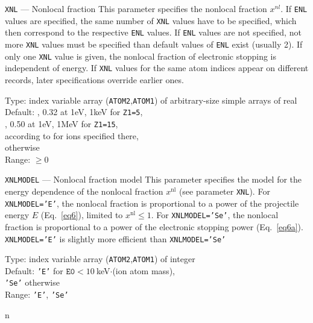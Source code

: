 \begin{keydescription}{\texttt{XNL} --- Nonlocal fraction}
%
  This parameter specifies the nonlocal fraction $x^{nl}$. If \texttt{ENL}
  values are specified, the same number of \texttt{XNL} values have to be 
  specified, which then correspond to the respective \texttt{ENL} values. 
  If \texttt{ENL} values are not specified, not more \texttt{XNL}
  values must be specified than default values of \texttt{ENL} exist (usually
  2). If only one \texttt{XNL} value is given, the nonlocal fraction of
  electronic stopping is independent of energy. If \texttt{XNL} values for
  the same atom indices appear on different records, later specifications
  override earlier ones.
  \begin{keytab}
    Type:    \> index variable array (\texttt{ATOM2},\texttt{ATOM1}) 
                of arbitrary-size simple arrays of real \\
    Default: , 0.32 at 1eV, 1keV for \texttt{Z1=5}, \\
             , 0.50 at 1eV, 1MeV for \texttt{Z1=15}, \\
             \> according to \cite{I0104} for ions specified there, \\
              otherwise \\
    Range:   \> $\ge 0$
  \end{keytab}
\end{keydescription}

\begin{keydescription}{\texttt{XNLMODEL} --- Nonlocal fraction model}
%
  This parameter specifies the model for the energy dependence of the
  nonlocal fraction $x^\mathrm{nl}$ (see parameter \texttt{XNL}). For
  \texttt{XNLMODEL='E'}, the nonlocal fraction is proportional to a power
  of the projectile energy $E$ (Eq.~\ref{eq6}), limited to 
  $x^\mathrm{nl} \le 1$. For \texttt{XNLMODEL='Se'}, the nonlocal fraction 
  is proportional to a power of the electronic stopping power (Eq.~\ref{eq6a}).
  \texttt{XNLMODEL='E'} is slightly more efficient than \texttt{XNLMODEL='Se'}
  \begin{keytab}
    Type:    \> index variable array (\texttt{ATOM2},\texttt{ATOM1}) 
                of integer \\
    Default: \> \texttt{'E'} for $\texttt{E0} < 10~$keV$\cdot$(ion atom mass), \\
             \> \texttt{'Se'} otherwise \\
    Range:   \> \texttt{'E'}, \texttt{'Se'}
  \end{keytab}
\end{keydescription}

n